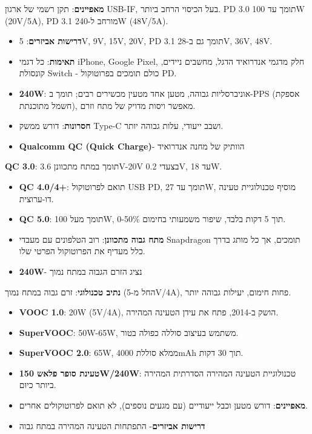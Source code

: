 
\textbf{מאפיינים}: תקן רשמי של ארגון USB-IF, בעל הכיסוי הרחב ביותר. PD 3.0 תומך עד 100W (20V/5A), PD 3.1 מורחב ל-240W (48V/5A).

\begin{itemize}
  \item \textbf{דרישות אביזרים}: 5V, 9V, 15V, 20V, PD 3.1 תומך גם ב-28V, 36V, 48V.
  \item \textbf{תאימות}: כל דגמי iPhone, Google Pixel, חלק מדגמי אנדרואיד הדגל, מחשבים ניידים, קונסולת Switch - כולם תומכים בפרוטוקול PD.
  \item \textbf{240W}: אוניברסליות גבוהה, מטען אחד מטעין מכשירים רבים; תומך ב-PPS (אספקת חשמל מתוכנתת), מאפשר ויסות מדויק של מתח וזרם.
  \item \textbf{חסרונות}: דורש ממשק Type-C ושבב ייעודי, עלות גבוהה יותר.
  \item \textbf{Qualcomm QC (Quick Charge)}- הוותיק של מחנה אנדרואיד
\end{itemize}

\textbf{QC 3.0}: תומך במתח מתכוונן 3.6V-20V בצעדי 0.2V, עד 18W.

\begin{itemize}
  \item \textbf{QC 4.0/4+}: תואם לפרוטוקול USB PD, תומך עד 27W, מוסיף טכנולוגיית טעינה דו-ערוצית.
  \item \textbf{QC 5.0}: תומך מעל 100W, 0-50\% תוך 5 דקות בלבד, שיפור משמעותי בחימום.
  \item \textbf{מתח גבוה מתכוונן}: רוב הטלפונים עם מעבדי Snapdragon תומכים, אך כל מותג בדרך כלל מעדיף את הפרוטוקול הפרטי שלו.
  \item \textbf{240W}- נציג הזרם הגבוה במתח נמוך
\end{itemize}

\textbf{נתיב טכנולוגי}: זרם גבוה במתח נמוך (החל מ-5V/4A), פחות חימום, יעילות גבוהה יותר.

\begin{itemize}
  \item \textbf{VOOC 1.0}: 20W (5V/4A), הושק ב-2014, פתח את עידן הטעינה המהירה.
  \item \textbf{SuperVOOC}: 50W-65W, משתמש בעיצוב סוללה כפולה בטור.
  \item \textbf{SuperVOOC 2.0}: 65W, ממלא סוללת 4000mAh תוך 30 דקות.
  \item \textbf{טעינת סופר פלאש 150W/240W}: טכנולוגיית הטעינה המהירה הסדרתית המהירה ביותר כיום.
  \item \textbf{מאפיינים}: דורש מטען וכבל ייעודיים (עם מגעים נוספים), לא תואם לפרוטוקולים אחרים.
  \item \textbf{דרישות אביזרים}- התפתחות הטעינה המהירה במתח גבוה
\end{itemize}

